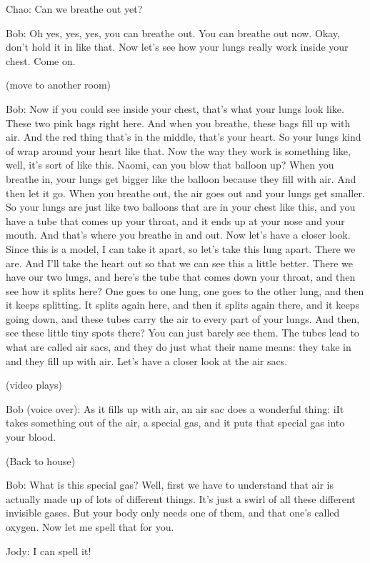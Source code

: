 Chao: Can we breathe out yet?

Bob: Oh yes, yes, yes, you can breathe out. You can breathe out now. Okay, don't hold it in like that. Now let's see how your lungs really work inside your chest. Come on.

(move to another room)

Bob: Now if you could see inside your chest, that's what your lungs look like. These two pink bags right here. And when you breathe, these bags fill up with air. And the red thing that's in the middle, that's your heart. So your lungs kind of wrap around your heart like that. Now the way they work is something like, well, it's sort of like this. Naomi, can you blow that balloon up? When you breathe in, your lungs get bigger like the balloon because they fill with air. And then let it go. When you breathe out, the air goes out and your lungs get smaller. So your lungs are just like two balloons that are in your chest like this, and you have a tube that comes up your throat, and it ends up at your nose and your mouth. And that's where you breathe in and out. Now let's have a closer look. Since this is a model, I can take it apart, so let's take this lung apart. There we are. And I'll take the heart out so that we can see this a little better. There we have our two lungs, and here's the tube that comes down your throat, and then see how it splits here? One goes to one lung, one goes to the other lung, and then it keeps splitting. It splits again here, and then it splits again there, and it keeps going down, and these tubes carry the air to every part of your lungs. And then, see these little tiny spots there? You can just barely see them. The tubes lead to what are called air sacs, and they do just what their name means: they take in and they fill up with air. Let's have a closer look at the air sacs.

(video plays)

Bob (voice over): As it fills up with air, an air sac does a wonderful thing: iIt takes something out of the air, a special gas, and it puts that special gas into your blood.

(Back to house)

Bob: What is this special gas? Well, first we have to understand that air is actually made up of lots of different things. It's just a swirl of all these different invisible gases. But your body only needs one of them, and that one's called oxygen. Now let me spell that for you.

Jody: I can spell it!

